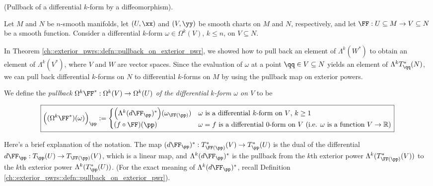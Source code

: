 \begin{defn}
\label{ch::diff_forms::defn::pullback_of_diff_form_by_diffeomorphism}
    (Pullback of a differential $k$-form by a diffeomorphism).
    
    Let $M$ and $N$ be $n$-smooth manifolds, let $(U, \xx)$ and $(V, \yy)$ be smooth charts on $M$ and $N$, respectively, and let $\FF:U \subseteq M \rightarrow V \subseteq N$ be a smooth function. Consider a differential $k$-form $\omega \in \Omega^k(V)$, $k \leq n$, on $V \subseteq N$.
    
    In Theorem \ref{ch::exterior_pwrs::defn::pullback_on_exterior_pwr}, we showed how to pull back an element of $\Lambda^k(W^*)$ to obtain an element of $\Lambda^k(V^*)$, where $V$ and $W$ are vector spaces. Since the evaluation of $\omega$ at a point $\qq \in V \subseteq N$ yields an element of $\Lambda^k T_\qq^*(N)$, we can pull back differential $k$-forms on $N$ to differential $k$-forms on $M$ by using the pullback map on exterior powers.
    
    We define the \textit{pullback $\Omega^k \FF^*:\Omega^k(V) \rightarrow \Omega^k(U)$ of the differential $k$-form $\omega$ on $V$} to be
    
    \begin{align*}
        \boxed
        {
            \Big( (\Omega^k \FF^*)(\omega) \Big)_\pp :=
            \begin{cases}
                \Big( \Lambda^k (d\FF_\pp)^* \Big)(\omega_{\FF(\pp)}) & \text{$\omega$ is a differential $k$-form on $V$, $k \geq 1$} \\
                (f \circ \FF)(\pp) & \text{$\omega = f$ is a differential $0$-form on $V$ (i.e. $\omega$ is a function $V \rightarrow \R$)}
            \end{cases}
        }
    \end{align*}

    Here's a brief explanation of the notation. The map $(d\FF_\pp)^*:T_{\FF(\pp)}^*(V) \rightarrow T_{\pp}^*(U)$ is the dual of the differential ${d\FF_\pp:T_\pp(U) \rightarrow T_{\FF(\pp)}(V)}$, which is a linear map, and $\Lambda^k (d\FF_\pp)^*$ is the pullback from the $k$th exterior power $\Lambda^k(T_{\FF(\pp)}^*(V))$ to the $k$th exterior power $\Lambda^k(T_{\pp}^*(U))$. (For the exact meaning of $\Lambda^k (d\FF_\pp)^*$, recall Definition \ref{ch::exterior_pwrs::defn::pullback_on_exterior_pwr}).
\end{defn}

